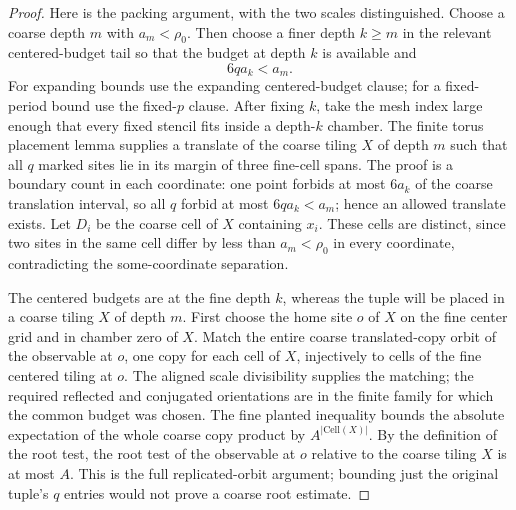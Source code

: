 \begin{proof}
Here is the packing argument, with the two scales distinguished. Choose a coarse depth $m$ with $a_m<\rho_0$. Then choose a finer depth $k\geq m$ in the relevant centered-budget tail so that the budget at depth $k$ is available and
\[
 6q a_k<a_m.
\]
For expanding bounds use the expanding centered-budget clause; for a fixed-period bound use the fixed-$p$ clause. After fixing $k$, take the mesh index large enough that every fixed stencil fits inside a depth-$k$ chamber. The finite torus placement lemma supplies a translate of the coarse tiling $X$ of depth $m$ such that all $q$ marked sites lie in its margin of three fine-cell spans. The proof is a boundary count in each coordinate: one point forbids at most $6a_k$ of the coarse translation interval, so all $q$ forbid at most $6q a_k<a_m$; hence an allowed translate exists. Let $D_i$ be the coarse cell of $X$ containing $x_i$. These cells are distinct, since two sites in the same cell differ by less than $a_m<\rho_0$ in every coordinate, contradicting the some-coordinate separation.

The centered budgets are at the fine depth $k$, whereas the tuple will be placed in a coarse tiling $X$ of depth $m$. First choose the home site $o$ of $X$ on the fine center grid and in chamber zero of $X$. Match the entire coarse translated-copy orbit of the observable at $o$, one copy for each cell of $X$, injectively to cells of the fine centered tiling at $o$. The aligned scale divisibility supplies the matching; the required reflected and conjugated orientations are in the finite family for which the common budget was chosen. The fine planted inequality bounds the absolute expectation of the whole coarse copy product by $A^{|\mathrm{Cell}(X)|}$. By the definition of the root test, the root test of the observable at $o$ relative to the coarse tiling $X$ is at most $A$. This is the full replicated-orbit argument; bounding just the original tuple's $q$ entries would not prove a coarse root estimate.


\end{proof}
